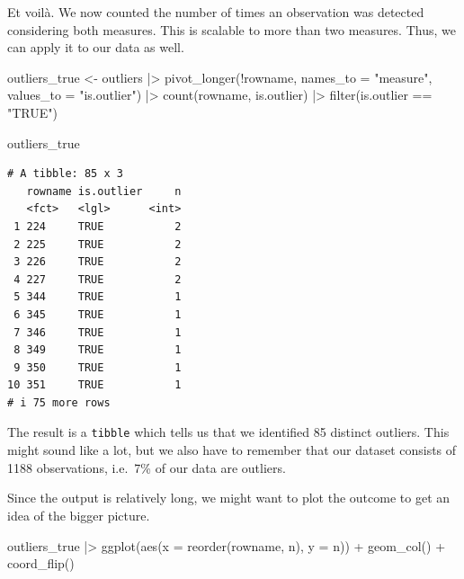 \documentclass[
  letterpaper,
]{krantz}
\makeatletter
\newenvironment{Shaded}{\begin{snugshade}}{\end{snugshade}}
\newcommand{\AttributeTok}[1]{\textcolor[rgb]{0.40,0.45,0.13}{#1}}
\newcommand{\FunctionTok}[1]{\textcolor[rgb]{0.28,0.35,0.67}{#1}}
\newcommand{\NormalTok}[1]{\textcolor[rgb]{0.00,0.23,0.31}{#1}}
\newcommand{\OtherTok}[1]{\textcolor[rgb]{0.00,0.23,0.31}{#1}}
\newcommand{\SpecialCharTok}[1]{\textcolor[rgb]{0.37,0.37,0.37}{#1}}
\newcommand{\StringTok}[1]{\textcolor[rgb]{0.13,0.47,0.30}{#1}}
\newenvironment{kframe}{%
\medskip{}
\setlength{\fboxsep}{.8em}
 \def\at@end@of@kframe{}%
 \ifinner\ifhmode%
  \def\at@end@of@kframe{\end{minipage}}%
  \begin{minipage}{\columnwidth}%
 \fi\fi%
 \def\FrameCommand##1{\hskip\@totalleftmargin \hskip-\fboxsep
 \colorbox{shadecolor}{##1}\hskip-\fboxsep
     \hskip-\linewidth \hskip-\@totalleftmargin \hskip\columnwidth}%
 \MakeFramed {\advance\hsize-\width
   \@totalleftmargin\z@ \linewidth\hsize
   \@setminipage}}%
 {\par\unskip\endMakeFramed%
 \at@end@of@kframe}
\renewenvironment{Shaded}{\begin{kframe}}{\end{kframe}}
\makeatother
\begin{document}
Et voilà. We now counted the number of times an observation was detected
considering both measures. This is scalable to more than two measures.
Thus, we can apply it to our data as well.

\begin{Shaded}
\begin{Highlighting}[]
\NormalTok{outliers\_true }\OtherTok{\textless{}{-}}
\NormalTok{  outliers }\SpecialCharTok{|\textgreater{}}
  \FunctionTok{pivot\_longer}\NormalTok{(}\SpecialCharTok{!}\NormalTok{rowname,}
               \AttributeTok{names\_to =} \StringTok{"measure"}\NormalTok{,}
               \AttributeTok{values\_to =} \StringTok{"is.outlier"}\NormalTok{) }\SpecialCharTok{|\textgreater{}}
  \FunctionTok{count}\NormalTok{(rowname, is.outlier) }\SpecialCharTok{|\textgreater{}}
  \FunctionTok{filter}\NormalTok{(is.outlier }\SpecialCharTok{==} \StringTok{"TRUE"}\NormalTok{)}

\NormalTok{outliers\_true}
\end{Highlighting}
\end{Shaded}

\begin{verbatim}
# A tibble: 85 x 3
   rowname is.outlier     n
   <fct>   <lgl>      <int>
 1 224     TRUE           2
 2 225     TRUE           2
 3 226     TRUE           2
 4 227     TRUE           2
 5 344     TRUE           1
 6 345     TRUE           1
 7 346     TRUE           1
 8 349     TRUE           1
 9 350     TRUE           1
10 351     TRUE           1
# i 75 more rows
\end{verbatim}

The result is a \texttt{tibble} which tells us that we identified 85
distinct outliers. This might sound like a lot, but we also have to
remember that our dataset consists of 1188 observations, i.e.~7\% of our
data are outliers.

Since the output is relatively long, we might want to plot the outcome
to get an idea of the bigger picture.

\begin{Shaded}
\begin{Highlighting}[]
\NormalTok{outliers\_true }\SpecialCharTok{|\textgreater{}}
  \FunctionTok{ggplot}\NormalTok{(}\FunctionTok{aes}\NormalTok{(}\AttributeTok{x =} \FunctionTok{reorder}\NormalTok{(rowname, n),}
             \AttributeTok{y =}\NormalTok{ n)) }\SpecialCharTok{+}
  \FunctionTok{geom\_col}\NormalTok{() }\SpecialCharTok{+}
  \FunctionTok{coord\_flip}\NormalTok{()}
\end{Highlighting}
\end{Shaded}
\end{document}
